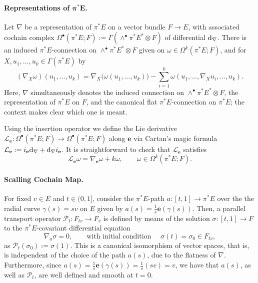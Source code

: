 \documentclass[12pt,letterpaper]{article}
\let\oldd\d
\renewcommand{\d}{%
  \relax\ifmmode\mathrm{d}\else\oldd\fi
}
\newcommand{\e}{\mathbf{e}}
\newcommand{\Lie}{\mathcal{L}}
\numberwithin{equation}{section}
\begin{document}
\paragraph{Representations of $\bm{\pi^*E}$.}
Let $\nabla$ be a representation of $\pi^*E$ on a vector bundle $F\to E$,
with associated cochain complex $\Omega^\bullet(\pi^*E;F):=\Gamma(\wedge^\bullet\pi^*E^*\otimes F)$ of differential $\d_\nabla$.
There is an induced $\pi^*E$-connection on $\wedge^\bullet\pi^*E^*\otimes F$ 
given on $\omega\in\Omega^k(\pi^*E;F)$, and for $X,u_1, \dots, u_k \in \Gamma(\pi^*E)$ by
\begin{equation}
    (\nabla_X \omega)(u_1, \dots, u_k) = \nabla_X \big( \omega(u_1, \dots, u_k) \big) - \sum_{i=1}^k \omega(u_1, \dots, \nabla_X u_i, \dots, u_k).
\end{equation}
Here, $\nabla$ simultaneously denotes the induced connection
on $\wedge^\bullet\pi^*E^*\otimes F$, the representation of $\pi^*E$ on $F$, and
the canonical flat $\pi^*E$-connection on $\pi^*E$; the context makes clear which one is meant.

Using the insertion operator we define the Lie derivative $\Lie_\e: \Omega^\bullet(\pi^*E; F) \to \Omega^\bullet(\pi^*E; F)$ along $\e$ 
via Cartan's magic formula $\Lie_\e := i_\e \d_\nabla + \d_\nabla i_\e$.
It is straightforward to check that $\Lie_\e$ satisfies
\begin{equation}\label{eq:Lie}
  \Lie_\e \omega = \nabla_\e \omega + k \omega, \qquad \omega\in\Omega^k(\pi^*E;F).
\end{equation}

\paragraph{Scalling Cochain Map.}

For fixed $v \in E$ and $t \in (0, 1]$, consider the $\pi^*E$-path $a: [t, 1] \to \pi^*E$
over the the radial curve $\gamma(s) = sv$ on $E$ given by $a(s) = \frac{1}{s} \e(\gamma(s))$.
Then, a parallel transport operator $\mathcal{P}_t: F_{tv} \to F_v$ is defined by means of
the solution $\sigma: [t,1] \to F$ to the $\pi^*E$-covariant differential equation 
\[
\nabla_{a} \sigma = 0, \qquad \text{with initial condition } \quad \sigma(t) = \sigma_0 \in F_{tv},
\]
as $\mathcal{P}_t(\sigma_0) := \sigma(1)$.
This is a canonical isomorphism of vector spaces, that is, is independent of the choice of the path $a(s)$,
due to the flatness of $\nabla$.
Furthermore, since $a(s) = \frac{1}{s} \e(\gamma(s)) = \frac{1}{s}(sv) = v$, we have that
$a(s)$, as well as $\mathcal{P}_t$, are well defined and smooth at $t=0$.
\end{document}
